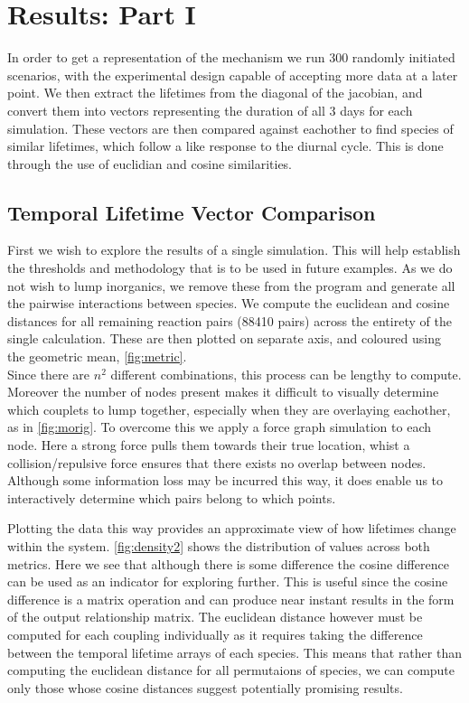 
\section{Results: Part I}

In order to get a representation of the mechanism we run 300 randomly initiated scenarios, with the experimental design capable of accepting more data at a later point. We then extract the lifetimes from the diagonal of the jacobian, and convert them into vectors representing the duration of all 3 days for each simulation. These vectors are then compared against eachother to find species of similar lifetimes, which follow a like response to the diurnal cycle. This is done through the use of euclidian and cosine similarities. 

\subsection{Temporal Lifetime Vector Comparison}
First we wish to explore the results of a single simulation. This will help establish the thresholds and methodology that is to be used in future examples. As we do not wish to lump inorganics, we remove these from the program and generate all the pairwise interactions between species. We compute the euclidean and cosine distances for all remaining reaction pairs (88410 pairs) across the entirety of the single calculation. These are then plotted on separate axis, and coloured using the geometric mean, \autoref{fig:metric}. \\

Since there are $n^2$ different combinations, this process can be lengthy to compute. Moreover the number of nodes present makes it difficult to visually determine which couplets to lump together, especially when they are overlaying eachother, as in \autoref{fig:morig}. To overcome this we apply a force graph simulation to each node. Here a strong force pulls them towards their true location, whist a collision/repulsive force ensures that there exists no overlap between nodes. Although some information loss may be incurred this way, it does enable us to interactively determine which pairs belong to which points.   

Plotting the data this way provides an approximate view of how lifetimes change within the system. \autoref{fig:density2} shows the distribution of values across both metrics. Here we see that although there is some difference the cosine difference can be used as an indicator for exploring further. This is useful since the cosine difference is a matrix operation and can produce near instant results in the form of the output relationship matrix. The euclidean distance however must be computed for each coupling individually as it requires taking the difference between the temporal lifetime arrays of each species. This means that rather than computing the euclidean distance for all permutaions of species, we can compute only those whose cosine distances suggest potentially promising results.  



